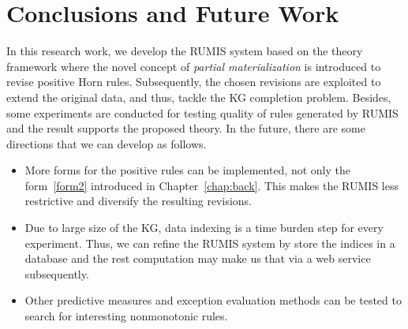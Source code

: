 \chapter{Conclusions and Future Work}
\label{chap:conclusion}

In this research work, we develop the RUMIS system based on the theory framework where the novel concept of \textit{partial materialization} is introduced to revise positive Horn rules. Subsequently, the chosen revisions are exploited to extend the original data, and thus, tackle the KG completion problem. Besides, some experiments are conducted for testing quality of rules generated by RUMIS and the result supports the proposed theory. In the future, there are some directions that we can develop as follows.

\begin{itemize}
\item More forms for the positive rules can be implemented, not only the form~\ref{form2} introduced in Chapter~\ref{chap:back}. This makes the RUMIS less restrictive and diversify the resulting revisions.
\item Due to large size of the KG, data indexing is a time burden step for every experiment. Thus, we can refine the RUMIS system by store the indices in a database and the rest computation may make us that via a web service subsequently.
\item Other predictive measures and exception evaluation methods can be tested to search for interesting nonmonotonic rules.
\end{itemize}